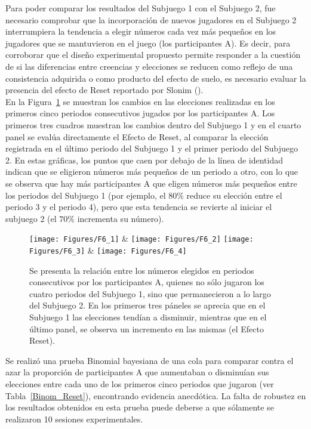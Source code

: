 Para poder comparar los resultados del Subjuego 1 con el Subjuego 2, fue necesario comprobar que la incorporación de nuevos jugadores en el Subjuego 2 interrumpiera la tendencia a elegir números cada vez más pequeños en los jugadores que se mantuvieron en el juego (los participantes A). Es decir, para corroborar que el diseño experimental propuesto permite responder a la cuestión de si las diferencias entre creencias y elecciones se reducen como reflejo de una consistencia adquirida o como producto del efecto de suelo, es necesario evaluar la presencia del efecto de Reset reportado por Slonim (\citeyear{Slonim}).\\

En la Figura~\ref{fig:Reset_cambios} se muestran los cambios en las elecciones realizadas en los primeros cinco periodos consecutivos jugados por los participantes A. Los primeros tres cuadros muestran los cambios dentro del Subjuego 1 y en el cuarto panel se evalúa directamente el Efecto de Reset, al comparar la elección registrada en el último periodo del Subjuego 1 y el primer periodo del Subjuego 2. En estas gráficas, los puntos que caen por debajo de la línea de identidad indican que se eligieron números más pequeños de un periodo a otro, con lo que se observa que hay más participantes A que eligen números más pequeños entre los periodos del Subjuego 1 (por ejemplo, el $80\%$ reduce su elección entre el periodo 3 y el periodo 4), pero que esta tendencia se revierte al iniciar el subjuego 2 (el $70\%$ incrementa su número).\\

\begin{figure}[h]
\centering
\texttt{[image: Figures/F6\_1]} & \texttt{[image: Figures/F6\_2]} 
\texttt{[image: Figures/F6\_3]} & \texttt{[image: Figures/F6\_4]} 
\decoRule
\caption[Elecciones registradas en ensayos consecutivos]{Se presenta la relación entre los números elegidos en periodos consecutivos por los participantes A, quienes no sólo jugaron los cuatro periodos del Subjuego 1, sino que permanecieron a lo largo del Subjuego 2. En los primeros tres páneles se aprecia que en el Subjuego 1 las elecciones tendían a disminuir, mientras que en el último panel, se observa un incremento en las mismas (el Efecto Reset).}
\label{fig:Reset_cambios}
\end{figure}

Se realizó una prueba Binomial bayesiana de una cola para comparar contra el azar la proporción de participantes A que aumentaban o disminuían sus elecciones entre cada uno de los primeros cinco periodos que jugaron (ver Tabla~\ref{Binom_Reset}), encontrando evidencia anecdótica. La falta de robustez en los resultados obtenidos en esta prueba puede deberse a que sólamente se realizaron 10 sesiones experimentales.\\

